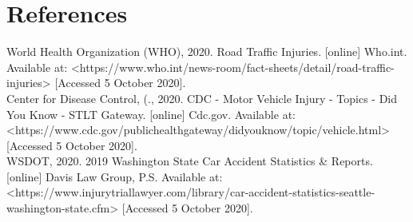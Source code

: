 \documentclass[a4paper,12pt]{article}
\begin{document}
\newpage
\section*{References}
World Health Organization (WHO), 2020. Road Traffic Injuries. [online] Who.int. Available at: <https://www.who.int/news-room/fact-sheets/detail/road-traffic-injuries> [Accessed 5 October 2020].\\

Center for Disease Control, (., 2020. CDC - Motor Vehicle Injury - Topics - Did You Know - STLT Gateway. [online] Cdc.gov. Available at: \newline
<https://www.cdc.gov/publichealthgateway/didyouknow/topic/vehicle.html> [Accessed 5 October 2020].\\

WSDOT, 2020. 2019 Washington State Car Accident Statistics & Reports. [online] Davis Law Group, P.S. Available at: <https://www.injurytriallawyer.com/library/car-accident-statistics-seattle-washington-state.cfm> [Accessed 5 October 2020].
\end{document}
